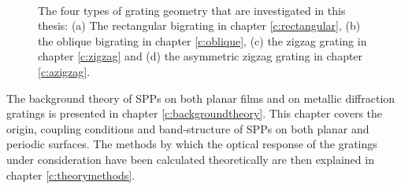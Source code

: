 \begin{figure}
\begin{center}
\\
\end{center}
\caption[The four types of grating geometry that are investigated in this thesis: The rectangular bigrating, the oblique bigrating, the zigzag grating, and the asymmetric zigzag grating.]{The four types of grating geometry that are investigated in this thesis: (a) The rectangular bigrating in chapter \ref{c:rectangular}, (b) the oblique bigrating in chapter \ref{c:oblique}, (c) the zigzag grating in chapter \ref{c:zigzag} and (d) the asymmetric zigzag grating in chapter \ref{c:azigzag}. \label{fig:intro-thegratings}}
\end{figure}

The background theory of SPPs on both planar films and on metallic diffraction gratings is presented in chapter \ref{c:backgroundtheory}. This chapter covers the origin, coupling conditions and band-structure of SPPs on both planar and periodic surfaces. The methods by which the optical response of the gratings under consideration have been calculated theoretically are then explained in chapter \ref{c:theorymethods}.

